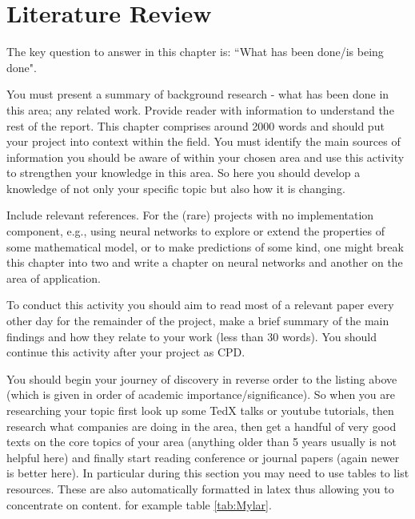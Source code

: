 \chapter{Literature Review}
\label{chap:litreview}
The key question to answer in this chapter is: ``What has been done/is being done". 

You must present a summary of background research - what has been done in this area; any related work. Provide reader with information to understand the rest of the report. This chapter comprises around 2000 words and should put your project into context within the field. You must identify the main sources of information you should be aware of within your chosen area and use this activity to strengthen your knowledge in this area. So here you should develop a knowledge of not only your specific topic but also how it is changing. 

Include relevant references. For the (rare) projects with no implementation component, e.g., using neural networks to explore or extend the properties of some mathematical model, or to make predictions of some kind, one might break this chapter into two and write a chapter on neural networks and another on the area of application.

To conduct this activity you should aim to read most of a relevant paper every other day for the remainder of the project, make a brief summary of the main findings and how they relate to your work (less than 30 words). You should continue this activity after your project as CPD.

You should begin your journey of discovery in reverse order to the listing above (which is given in order of academic importance/significance). So when you are researching your topic first look up some TedX talks or youtube tutorials, then research what companies are doing in the area, then get a handful of very good texts on the core topics of your area (anything older than 5 years usually is not helpful here) and finally start reading conference or journal papers (again newer is better here). In particular during this section you may need to use tables to list resources. These are also automatically formatted in latex thus allowing you to concentrate on content. for example table \ref{tab:Mylar}.

